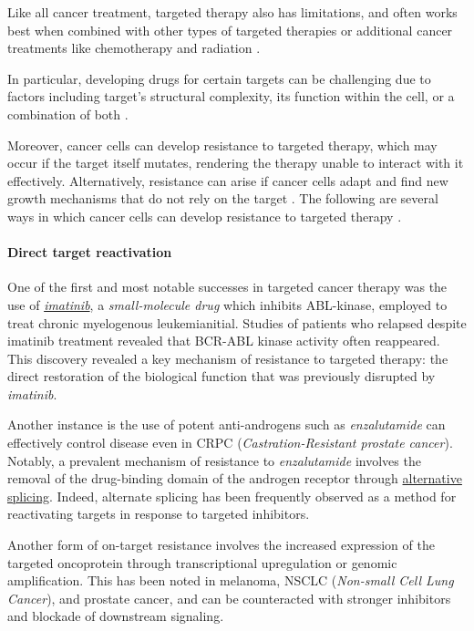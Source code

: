 Like all cancer treatment, targeted therapy also has limitations, and often works best when combined with other types of targeted therapies or additional cancer treatments like chemotherapy and radiation \cite{target_therapy1}.

In particular, developing drugs for certain targets can be challenging due to factors including target's structural complexity, its function within the cell, or a combination of both \cite{target_therapy1}. 

Moreover, cancer cells can develop resistance to targeted therapy, which may occur if the target itself mutates, rendering the therapy unable to interact with it effectively. Alternatively, resistance can arise if cancer cells adapt and find new growth mechanisms that do not rely on the target \cite{target_therapy1}. The following are several ways in which cancer cells can develop resistance to targeted therapy \cite{target_therapy2}.

\paragraph{Direct target reactivation}

One of the first and most notable successes in targeted cancer therapy was the use of \href{https://en.wikipedia.org/wiki/Imatinib}{\textit{imatinib}}, a \textit{small-molecule drug} which inhibits ABL-kinase, employed to treat chronic myelogenous leukemianitial. Studies of patients who relapsed despite imatinib treatment revealed that BCR-ABL kinase activity often reappeared. This discovery revealed a key mechanism of resistance to targeted therapy: the direct restoration of the biological function that was previously disrupted by \textit{imatinib}.

Another instance is the use of potent anti-androgens such as \textit{enzalutamide} can effectively control disease even in CRPC (\textit{Castration-Resistant prostate cancer}). Notably, a prevalent mechanism of resistance to \textit{enzalutamide} involves the removal of the drug-binding domain of the androgen receptor through \href{https://en.wikipedia.org/wiki/Alternative_splicing}{alternative splicing}. Indeed, alternate splicing has been frequently observed as a method for reactivating targets in response to targeted inhibitors.

Another form of on-target resistance involves the increased expression of the targeted oncoprotein through transcriptional upregulation or genomic amplification. This has been noted in melanoma, NSCLC (\textit{Non-small Cell Lung Cancer}), and prostate cancer, and can be counteracted with stronger inhibitors and blockade of downstream signaling.


